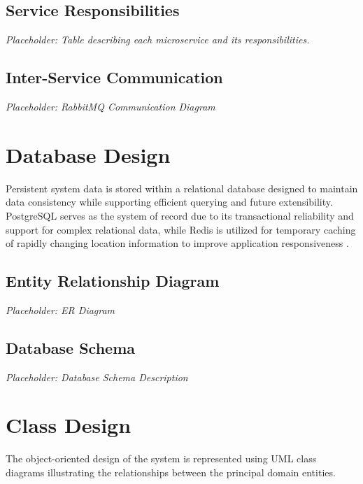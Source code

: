 \subsection{Service Responsibilities}

\textit{Placeholder: Table describing each microservice and its responsibilities.}

\subsection{Inter-Service Communication}

\textit{Placeholder: RabbitMQ Communication Diagram}


\section{Database Design}

Persistent system data is stored within a relational database designed to maintain data consistency while supporting efficient querying and future extensibility. PostgreSQL serves as the system of record due to its transactional reliability and support for complex relational data, while Redis is utilized for temporary caching of rapidly changing location information to improve application responsiveness \cite{postgresql,redis}.

\subsection{Entity Relationship Diagram}

\textit{Placeholder: ER Diagram}

\subsection{Database Schema}

\textit{Placeholder: Database Schema Description}


\section{Class Design}

The object-oriented design of the system is represented using UML class diagrams illustrating the relationships between the principal domain entities.

